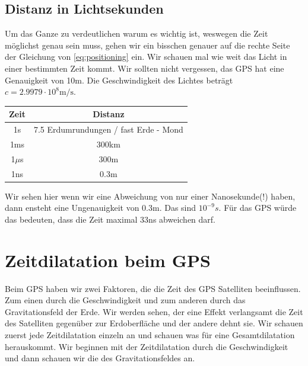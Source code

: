 \begin{refsection}
\subsection{Distanz in Lichtsekunden}
Um das Ganze zu verdeutlichen warum es wichtig ist, weswegen die Zeit möglichst genau sein muss, gehen wir ein bisschen genauer auf die rechte Seite der Gleichung von \ref{eq:positioning} ein. Wir schauen mal wie weit das Licht in einer bestimmten Zeit kommt. Wir sollten nicht vergessen, das GPS hat eine Genauigkeit von 10m. Die Geschwindigkeit des Lichtes beträgt  \(c = 2.9979 \cdot 10^8 \text{m/s}\).
\begin{center}
\begin{tabular}{| c | c |}
\hline
Zeit & Distanz \\
\hline
1s & 7.5 Erdumrundungen / fast Erde - Mond \\
1ms & 300km \\
1$\mu$s & 300m \\
1ns & 0.3m \\
\hline
\end{tabular}
\end{center}
Wir sehen hier wenn wir eine Abweichung von nur einer Nanosekunde(!) haben, dann ensteht eine Ungenauigkeit von 0.3m. Das sind \(10^{-9}s\). Für das GPS würde das bedeuten, dass die Zeit maximal 33ns abweichen darf.

\section{Zeitdilatation beim GPS}
Beim GPS haben wir zwei Faktoren, die die Zeit des GPS Satelliten beeinflussen. Zum einen durch die Geschwindigkeit und zum anderen durch das Gravitationsfeld der Erde. Wir werden sehen, der eine Effekt verlangsamt die Zeit des Satelliten gegenüber zur Erdoberfläche und der andere dehnt sie. Wir schauen zuerst jede Zeitdilatation einzeln an und schauen was für eine Gesamtdilatation herauskommt. Wir beginnen mit der Zeitdilatation durch die Geschwindigkeit und dann schauen wir die des Gravitationsfeldes an.


\end{refsection}

